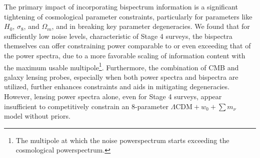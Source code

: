 \documentclass[11pt]{article} %
\begin{document}
The primary impact of incorporating bispectrum information is a significant tightening of cosmological parameter constraints, particularly for parameters like $H_0$, $\sigma_8$, and $\Omega_m$, and in breaking key parameter degeneracies. We found that for sufficiently low noise levels, characteristic of Stage 4 surveys, the bispectra themselves can offer constraining power comparable to or even exceeding that of the power spectra, due to a more favorable scaling of information content with the maximum usable multipole\footnote{The multipole at which the noise powerspectrum starts exceeding the cosmological powerspectrum.}. Furthermore, the combination of CMB and galaxy lensing probes, especially when both power spectra and bispectra are utilized, further enhances constraints and aids in mitigating degeneracies. However, lensing power spectra alone, even for Stage 4 surveys, appear insufficient to competitively constrain an 8-parameter $\Lambda\text{CDM} + w_0 + \sum m_\nu$ model without priors.
\end{document}
